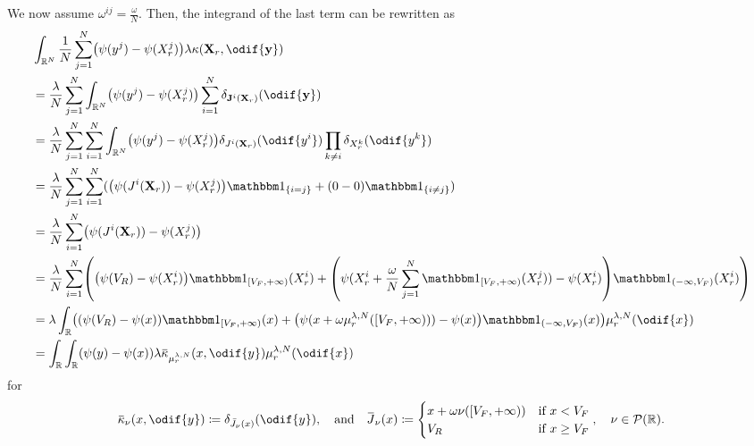 We now assume \(\omega^{ij} = \frac{\omega}{N}\).
Then, the integrand of the last term can be rewritten as
\begin{equation}\label{eq:kappa-to-mean-kappa}
  \begin{split}
     & \int_{\potspace^N} \frac{1}{N} \sum_{j=1}^N \br*{ \psi(y^j) - \psi(X_{r}^j) } \lambda \kappa(\bm{X}_r, \odif{\bm{y}})                                                                  \\
     & = \frac{\lambda}{N} \sum_{j=1}^N \int_{\potspace^N} \br*{ \psi(y^j) - \psi(X_{r}^j) } \sum_{i=1}^N \delta_{\bm{\jtarg}^i(\bm{X}_r)}(\odif{\bm{y}})                                     \\
     & = \frac{\lambda}{N} \sum_{j=1}^N \sum_{i=1}^N \int_{\potspace^N} \br*{ \psi(y^j) - \psi(X_{r}^j) } \delta_{\jtarg^i(\bm{X}_r)}(\odif{y^i}) \prod_{k \neq i} \delta_{X_r^k}(\odif{y^k}) \\
     & = \frac{\lambda}{N} \sum_{j=1}^N \sum_{i=1}^N \br{ \br*{ \psi(\jtarg^i(\bm{X}_r)) - \psi(X_{r}^j) } \ind{i = j} + (0 - 0) \ind{i \neq j} }                                             \\
     & = \frac{\lambda}{N} \sum_{i=1}^N \br*{ \psi(\jtarg^i(\bm{X}_r)) - \psi(X_{r}^j) }                                                                                                      \\
     & = \frac{\lambda}{N} \sum_{i=1}^N \br*{ \br*{ \psi(V_R) - \psi(X_{r}^i) } \indE{[V_F,+\infty)}(X_{r}^i)
    + \br*{ \psi(X_{r}^i + \frac{\omega}{N} \sum_{j=1}^N \indE{[V_F,+\infty)}(X_{r}^j)) - \psi(X_{r}^i) } \indE{(-\infty,V_F)}(X_{r}^i) }                                                     \\
     & = \lambda \int_\potspace \br*{ \br*{ \psi(V_R) - \psi(x) } \indE{[V_F,+\infty)}(x)
    + \br*{ \psi(x + \omega \mu_r^{\lambda, N}([V_F,+\infty))) - \psi(x) } \indE{(-\infty,V_F)}(x) } \mu_{r}^{\lambda, N}(\odif{x})                                                           \\
     & = \int_\potspace \int_\potspace (\psi(y) - \psi(x)) \lambda \ol{\kappa}_{\mu_{r}^{\lambda, N}}(x, \odif{y}) \mu_{r}^{\lambda, N}(\odif{x})
  \end{split}
\end{equation}
for
\begin{equation}
  \ol{\kappa}_\nu(x, \odif{y}) \coloneqq \delta_{\bar{\jtarg}_\nu(x)}(\odif{y}),
  \quad\text{and}\quad
  \ol{\jtarg}_\nu(x) \coloneqq \begin{cases}
    x + \omega \nu([V_F,+\infty)) & \text{if } x < V_F    \\
    V_R                           & \text{if } x \geq V_F
  \end{cases}, \quad \nu \in \cP(\potspace).
\end{equation}
